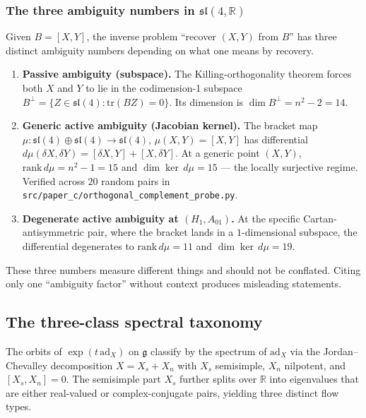 \documentclass[11pt,a4paper]{article}
\theoremstyle{plain}
\theoremstyle{definition}
\theoremstyle{remark}
\begin{document}
\subsubsection*{The three ambiguity numbers in \texorpdfstring{$\mathfrak{sl}(4,\mathbb{R})$}{sl(4,R)}}

Given $B = [X, Y]$, the inverse problem ``recover $(X, Y)$ from $B$''
has three distinct ambiguity numbers depending on what one means by
recovery.

\begin{enumerate}[label=(\alph*)]
  \item \textbf{Passive ambiguity (subspace).}
    The Killing-orthogonality theorem forces both $X$ and $Y$ to lie
    in the codimension-1 subspace
    \(
      B^\perp = \{Z \in \mathfrak{sl}(4) : \mathrm{tr}(BZ) = 0\}.
    \)
    Its dimension is $\dim B^\perp = n^2 - 2 = 14$.
  \item \textbf{Generic active ambiguity (Jacobian kernel).}
    The bracket map $\mu : \mathfrak{sl}(4) \oplus \mathfrak{sl}(4) \to \mathfrak{sl}(4)$,
    $\mu(X, Y) = [X, Y]$ has differential
    $d\mu(\delta X, \delta Y) = [\delta X, Y] + [X, \delta Y]$.
    At a generic point $(X, Y)$, $\mathrm{rank}\,d\mu = n^2 - 1 = 15$
    and $\dim \ker\,d\mu = 15$ --- the locally surjective regime.
    Verified across $20$ random pairs in
    \texttt{src/paper\_c/orthogonal\_complement\_probe.py}.
  \item \textbf{Degenerate active ambiguity at $(H_1, A_{01})$.}
    At the specific Cartan-antisymmetric pair, where the bracket lands
    in a $1$-dimensional subspace, the differential degenerates to
    $\mathrm{rank}\,d\mu = 11$ and $\dim \ker\,d\mu = 19$.
\end{enumerate}

These three numbers measure different things and should not be
conflated.  Citing only one ``ambiguity factor'' without context
produces misleading statements.

\subsection{The three-class spectral taxonomy}
\label{sec:taxonomy}

The orbits of $\exp(t\,\mathrm{ad}_X)$ on $\mathfrak{g}$ classify by
the spectrum of $\mathrm{ad}_X$ via the Jordan--Chevalley decomposition
$X = X_s + X_n$ with $X_s$ semisimple, $X_n$ nilpotent, and
$[X_s, X_n] = 0$.  The semisimple part $X_s$ further splits over
$\mathbb{R}$ into eigenvalues that are either real-valued or
complex-conjugate pairs, yielding three distinct flow types.
\end{document}

